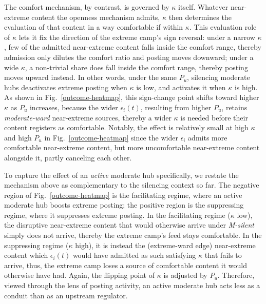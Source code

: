 \documentclass{svproc}
\def\BoundedConfidence{\epsilon} %
\def\VCR{\kappa}                 %
\begin{document}
The comfort mechanism, by contrast, is governed by $\VCR$ itself. 
Whatever near-extreme content the openness
mechanism admits, $\VCR$ then determines the evaluation of that
content in a way comfortable if within $\VCR$.
This evaluation role of $\VCR$ lets it fix
the direction of the extreme
camp's sign reversal: under a narrow $\VCR$, few of the
admitted near-extreme content falls inside the comfort range, thereby
admission only dilutes the comfort ratio and posting moves
downward; under a wide $\VCR$, a non-trivial share does fall inside
the comfort range, thereby posting moves upward instead. In other words,
under the same $P_u$, silencing moderate hubs deactivates extreme
posting when $\VCR$ is low, and activates it when $\VCR$ is high. 
As shown in Fig.~\ref{outcome-heatmap},
this sign-change point shifts toward higher $\VCR$ as $P_u$
increases, because the wider $\BoundedConfidence_i(t)$, resulting from 
higher $P_u$, retains \emph{moderate-ward} near-extreme sources, 
thereby a wider $\VCR$ is
needed before their content registers as comfortable. Notably, the
effect is relatively small at high $\VCR$ and high $P_u$ in
Fig.~\ref{outcome-heatmap} since the wider $\BoundedConfidence_i$ 
admits more comfortable near-extreme content,
but more uncomfortable near-extreme content alongside it, 
partly canceling each other. 

To capture the effect of an \emph{active} moderate hub specifically,
we restate the mechanism above as complementary to the silencing 
context so far. 
The negative region
of Fig.~\ref{outcome-heatmap} is the facilitating regime, where an
active moderate hub boosts extreme posting; the positive region is
the suppressing regime, where it suppresses extreme posting. In the
facilitating regime ($\VCR$ low), the disruptive near-extreme
content that would otherwise arrive under \emph{M-silent} simply
does not arrive, thereby the extreme camp's feed stays comfortable. In
the suppressing regime ($\VCR$ high), it is instead the 
(extreme-ward edge) near-extreme
content which $\BoundedConfidence_i(t)$ would have admitted as such 
satisfying $\VCR$ that fails to arrive, thus, the extreme camp loses a
source of comfortable content it would otherwise have had. 
Again, the flipping point of $\VCR$ is adjusted by $P_u$. 
Therefore,
viewed through the lens of posting activity, an active moderate hub
acts less as a conduit than as an upstream regulator.
\end{document}
